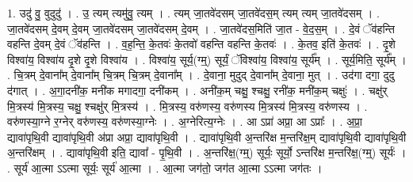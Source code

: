 \documentclass[17pt]{extarticle}
\begin{document}
1. उदु॑ वु॒ वुदुदु॑ । . उ॒ त्यम् त्यमु॑वु॒ त्यम् । . त्यम् जा॒तवे॑दसम् जा॒तवे॑दस॒म् त्यम् त्यम् जा॒तवे॑दसम् । . जा॒तवे॑दसम् दे॒वम् दे॒वम् जा॒तवे॑दसम् जा॒तवे॑दसम् दे॒वम् । . जा॒तवे॑दस॒मिति॑ जा॒त - वे॒द॒स॒म् । . दे॒वं ॅव॑हन्ति वहन्ति दे॒वम् दे॒वं ॅव॑हन्ति । . व॒ह॒न्ति॒ के॒तवः॑ के॒तवो॑ वहन्ति वहन्ति के॒तवः॑ । . के॒तव॒ इति॑ के॒तवः॑ । . दृ॒शे विश्वा॑य॒ विश्वा॑य दृ॒शे दृ॒शे विश्वा॑य । . विश्वा॑य॒ सूर्य॒(ग्म्॒) सूर्यं॒ ॅविश्वा॑य॒ विश्वा॑य॒ सूर्य᳚म् । . सूर्य॒मिति॒ सूर्य᳚म् । . चि॒त्रम् दे॒वाना᳚म् दे॒वाना᳚म् चि॒त्रम् चि॒त्रम् दे॒वाना᳚म् । . दे॒वाना॒ मुदुद् दे॒वाना᳚म् दे॒वाना॒ मुत् । . उद॑गा दगा॒ दुदु द॑गात् । . अ॒गा॒दनी॑क॒ मनी॑क मगादगा॒ दनी॑कम् । . अनी॑क॒म् चक्षु॒ श्चक्षु॒ रनी॑क॒ मनी॑क॒म् चक्षुः॑ । . चक्षु॑र् मि॒त्रस्य॑ मि॒त्रस्य॒ चक्षु॒ श्चक्षु॑र् मि॒त्रस्य॑ । . मि॒त्रस्य॒ वरु॑णस्य॒ वरु॑णस्य मि॒त्रस्य॑ मि॒त्रस्य॒ वरु॑णस्य । . वरु॑णस्या॒ग्ने र॒ग्नेर् वरु॑णस्य॒ वरु॑णस्या॒ग्नेः । . अ॒ग्नेरित्य॒ग्नेः । . आ ऽप्रा॑ अप्रा॒ आ ऽप्राः᳚ । . अ॒प्रा॒ द्यावा॑पृथि॒वी द्यावा॑पृथि॒वी अ॑प्रा अप्रा॒ द्यावा॑पृथि॒वी । . द्यावा॑पृथि॒वी अ॒न्तरि॑क्ष म॒न्तरि॑क्ष॒म् द्यावा॑पृथि॒वी द्यावा॑पृथि॒वी अ॒न्तरि॑क्षम् । . द्यावा॑पृथि॒वी इति॒ द्यावा᳚ - पृ॒थि॒वी । . अ॒न्तरि॑क्ष॒(ग्म्॒) सूर्यः॒ सूर्यो॒ ऽन्तरि॑क्ष म॒न्तरि॑क्ष॒(ग्म्॒) सूर्यः॑ । . सूर्य॑ आ॒त्मा ऽऽत्मा सूर्यः॒ सूर्य॑ आ॒त्मा । . आ॒त्मा जग॑तो॒ जग॑त आ॒त्मा ऽऽत्मा जग॑तः । \newline
\end{document}
